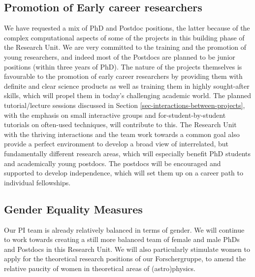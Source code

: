 \documentclass[10pt,fleqn,twoside]{article}
\begin{document}
\subsection{Promotion of Early career researchers}

\noindent We have requested a mix of PhD and Postdoc positions, the
latter because of the complex computational aspects of some of the
projects in this building phase of the Research Unit. We are very
committed to the training and the promotion of young researchers, and
indeed most of the Postdocs are planned to be junior positions (within
three years of PhD). The nature of the projects themselves is
favourable to the promotion of early career researchers by providing
them with definite and clear science products as well as training them
in highly sought-after skills, which will propel them in today's
challenging academic world. The planned 
tutorial/lecture sessions discussed in Section 
\ref{sec-interactions-between-projects}, with the emphasis on small
interactive groups and for-student-by-student tutorials on often-used
techniques, will contribute to this. The Research Unit with the thriving
interactions and the team work towards a common goal also provide a
perfect environment to develop a broad view of interrelated, but
fundamentally different research areas, which will especially benefit
PhD students and academically young postdocs. The postdocs will be
encouraged and supported to develop independence, which will set them
up on a career path to individual fellowships. 

\subsection{Gender Equality Measures}

Our PI team is already relatively balanced in terms of gender. We will
continue to work towards creating a still
more balanced team of female and male PhDs and Postdocs in this
Research Unit. We will also particularly stimulate women to apply for the theoretical research positions of our Forschergruppe, to amend the relative paucity of women in theoretical areas of (astro)physics.

\end{document}
